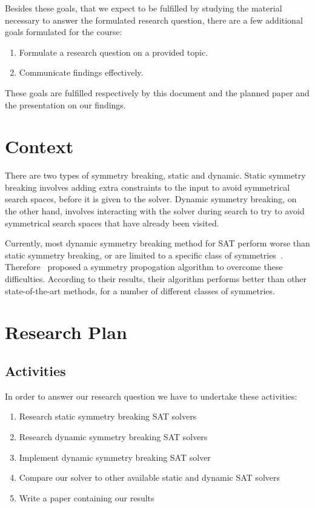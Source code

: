 			Besides these goals, that we expect to be fulfilled by studying the material necessary to answer the formulated research question, there are a few additional goals formulated for the course:

			\begin{enumerate}
				\item Formulate a research question on a provided topic.
				\item Communicate findings effectively.
			\end{enumerate}

			These goals are fulfilled respectively by this document and the planned paper and the	presentation on our findings.

	\section{Context}
		There are two types of symmetry breaking, static and dynamic. Static symmetry breaking involves adding extra constraints to the input to avoid symmetrical search spaces, before it is given to the solver. Dynamic symmetry breaking, on the other hand, involves interacting with the solver during search to try to avoid symmetrical search spaces that have already been visited.

		Currently, most dynamic symmetry breaking method for SAT perform worse than static symmetry breaking, or are limited to a specific class of symmetries~\cite{devriendt2012symmetry}. Therefore~\cite{devriendt2012symmetry} proposed a symmetry propogation algorithm to overcome these difficulties. According to their results, their algorithm performs better than other state-of-the-art methods, for a number of different classes of symmetries.

	\section{Research Plan}

		\subsection{Activities}
			In order to answer our research question we have to undertake these activities:
	
			\begin{enumerate}
				\item Research static symmetry breaking SAT solvers
				\item Research dynamic symmetry breaking SAT solvers
				\item Implement dynamic symmetry breaking SAT solver
				\item Compare our solver to other available static and dynamic SAT solvers
				\item Write a paper containing our results
			\end{enumerate}

